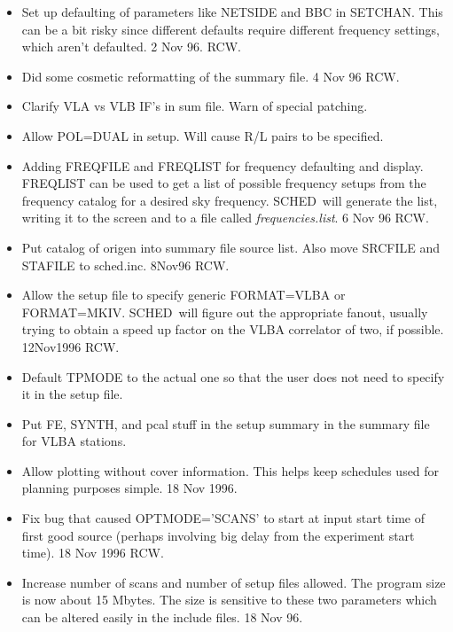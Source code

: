 \documentclass{report}
\newcommand{\schedb}{{\sc SCHED~}}
\begin{document}
\begin{itemize}
\item Set up defaulting of parameters like NETSIDE and BBC in
      SETCHAN.  This can be a bit risky since different defaults
      require different frequency settings, which aren't defaulted.
      2 Nov 96. RCW.

\item Did some cosmetic reformatting of the summary file.  4 Nov 96 RCW.

\item Clarify VLA vs VLB IF's in sum file.  Warn of special patching.

\item Allow POL=DUAL in setup.  Will cause R/L pairs to be specified.

\item Adding FREQFILE and FREQLIST for frequency defaulting and
      display.  FREQLIST can be used to get a list of possible
      frequency setups from the frequency catalog for a desired
      sky frequency.  \schedb will generate the list, writing it
      to the screen and to a file called {\sl frequencies.list}.
      6 Nov 96 RCW.

\item Put catalog of origen into summary file source list.  Also move
      SRCFILE and STAFILE to sched.inc.  8Nov96 RCW.

\item Allow the setup file to specify generic FORMAT=VLBA or
      FORMAT=MKIV.  \schedb will figure out the appropriate fanout,
      usually trying to obtain a speed up factor on the VLBA
      correlator of two, if possible.  12Nov1996 RCW.

\item Default TPMODE to the actual one so that the user does not
      need to specify it in the setup file.

\item Put FE, SYNTH, and pcal stuff in the setup summary in the
      summary file for VLBA stations.

\item Allow plotting without cover information.  This helps keep
      schedules used for planning purposes simple.  18 Nov 1996.

\item Fix bug that caused OPTMODE='SCANS' to start at input start
      time of first good source (perhaps involving big delay from
      the experiment start time). 18 Nov 1996 RCW.

\item Increase number of scans and number of setup files allowed.
      The program size is now about 15 Mbytes.  The size is
      sensitive to these two parameters which can be altered
      easily in the include files.  18 Nov 96.


\end{itemize}
\end{document}
